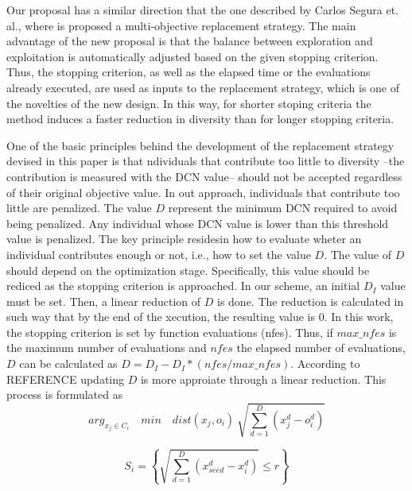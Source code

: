 Our proposal has a similar direction that the one described by Carlos Segura et. al., where is proposed a multi-objective replacement strategy.
%
The main advantage of the new proposal is that the balance between exploration and exploitation is automatically adjusted based on the given stopping criterion.
%
Thus, the stopping criterion, as well as the elapsed time or the evaluations already executed, are used as inputs to the replacement strategy, which is one of the novelties of the new design.
%
In this way, for shorter stoping criteria the method induces a faster reduction in diversity than for longer stopping criteria.


One of the basic principles behind the development of the replacement strategy devised in this paper  is that ndividuals that contribute too little to diversity --the contribution is measured with the DCN value-- should not be accepted regardless of their original objective value.
%
In out approach, individuals that contribute too little are penalized.
%
The value $D$ represent the minimum DCN required to avoid being penalized.
%
Any individual whose DCN value is lower than this threshold value is penalized.
%
The key principle residesin how to evaluate wheter an individual contributes enough or not, i.e., how to set the value $D$.
%
The value of $D$ should depend on the optimization stage.
%
Specifically, this value should be rediced as the stopping criterion is approached.
%
In our scheme, an initial $D_I$ value must be set.
%
Then, a linear reduction of $D$ is done.
%
The reduction is calculated in such way that by the end of the xecution, the resulting value is $0$.
%
In this work, the stopping criterion is set by function evaluations (nfes).
%
Thus, if $max\_nfes$ is the maximum number of evaluations and $nfes$ the elapsed number of evaluations, $D$ can be calculated as $D=D_I - D_I *(nfes/max\_nfes)$.
%
According to REFERENCE updating $D$ is more approiate through a linear reduction.
%
This process is formulated as
\begin{equation}
arg_{x_j \in C_i} \quad min \quad dist(x_j, o_i) \ \sqrt{ \sum_{d=1}^D ( x_j^d - o_i^d )}
\end{equation}

\begin{equation}
S_i = \left \{ \sqrt{ \sum_{d=1}^D (x_{seed}^d - x_i^d )  } \leq r \right \}
\end{equation}

